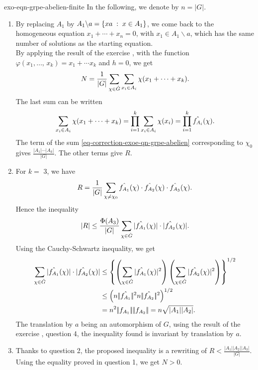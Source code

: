  
\begin{correction}{exo-eqn-grpe-abelien-finite}
In the following, we denote by $ n = |G| $. \begin{enumerate}
\item By replacing $ A_1 $ by $ A_1 \backslash a = \left\{ xa \;:\; x \in A_1 \right\} $, we come back to the homogeneous equation $ x_1 + \cdots + x_n = 0 $, with $ x_1 \in A_1 \backslash a $, which has the same number of solutions as the starting equation. \\By applying the result of the exercise , with the function $ \varphi (x_1, \ldots, \, x_k) = x_1 + \cdots x_k $ and $ h = 0 $, we get
\begin{equation}
\label{eq-correction-exoe-qn-grpe-abelien}
N = \frac{1}{|G|} \sum_{\chi \in \hat{G}}{\sum_{x_i \in A_i}{\chi (x_1 + \cdots + x_k)}}.
\end{equation}
The last sum can be written
\begin{equation*}
\sum_{x_i \in A_i}{\chi (x_1 + \cdots + x_k)} = \prod_{i = 1}^k{\sum_{x_i \in A_i}{\chi (x_i)}} = \prod_{i = 1}^k{\hat{f_{A_i}} (\chi)}.
\end{equation*}
The term of the sum \eqref{eq-correction-exoe-qn-grpe-abelien} corresponding to $ \chi_0 $ gives $ \frac{| A_1 | \cdots | A_k |}{|G|} $. The other terms give $ R $.
\item For $ k = $ 3, we have
\begin{equation*}
R = \frac{1}{|G|} \sum_{\chi \neq \chi_0}{\hat{f_{A_1}} (\chi) \cdot \hat{f_{A_2}} (\chi) \cdot \hat{f_{A_3}} (\chi)}.
\end{equation*}
Hence the inequality
\begin{equation*}
| R | \leq \frac{\Phi (A_3)}{|G|} \sum_{\chi \in \hat{G}}{| \hat{f_{A_1}} (\chi) | \cdot | \hat{f_{A_2}} (\chi) |}.
\end{equation*}
Using the Cauchy-Schwartz inequality, we get
\begin{align*}
\sum_{\chi \in \wh{G}}{| \wh{f_{A_1}} (\chi) | \cdot | \wh{f_{A_2}} (\chi) |} & \leq \left\{\left(\sum_{\chi \in \wh{G}}{| \wh{f_{A_1}} (\chi) |^2} \right) \left(\sum_{\chi \in \wh{G}}{| \wh{f_{A_2}} (\chi) |^2} \right) \right\}^{1/2} \\
& \leq \left(n \norm{\wh{f_{A_1}}}^2 n \norm{\wh{f_{A_2}}}^2 \right)^{1/2} \\
& = n^2 \norm{f_{A_1}} \norm{f_{A_2}} = n \sqrt{| A_1 | | A_2 |}.
\end{align*}
 The translation by $ a $ being an automorphism of $ G $, using the result of the exercise , question 4, the inequality found is invariant by translation by $ a $.
\item Thanks to question 2, the proposed inequality is a rewriting of $ R <\frac{| A_1 | | A_2 | | A_3 |}{|G|} $. Using the equality proved in question 1, we get $ N> 0 $.
\end{enumerate}
\end{correction}
 
